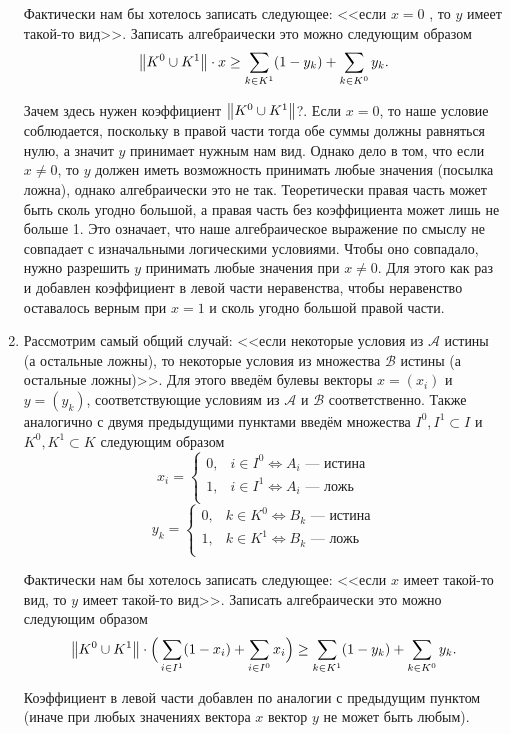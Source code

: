 \begin{enumerate}[nosep]
	Фактически нам бы хотелось записать следующее: <<если $x = 0$ , то $y$ имеет такой-то вид>>. Записать алгебраически это можно следующим образом
	\[
	\norm{K^0 \cup K^1} \cdot x  \ge \sum_{k \in K^1}(1-y_k) + \sum_{k \in K^0}y_k.
	\]
	
	Зачем здесь нужен коэффициент $\norm{K^0 \cup K^1}$?. Если $x = 0$, то наше условие соблюдается, поскольку в правой части тогда обе суммы должны равняться нулю, а значит $y$ принимает нужным нам вид. Однако дело в том, что если $x \neq 0$, то $y$ должен иметь возможность принимать любые значения (посылка ложна), однако алгебраически это не так. Теоретически правая часть может быть сколь угодно большой, а правая часть без коэффициента может лишь не больше 1. Это означает, что наше алгебраическое выражение по смыслу не совпадает с изначальными логическими условиями. Чтобы оно совпадало, нужно разрешить $y$ принимать любые значения при $x \neq 0$. Для этого как раз и добавлен коэффициент в левой части неравенства, чтобы неравенство оставалось верным при $x = 1$ и сколь угодно большой правой части.
	
	\item Рассмотрим самый общий случай: <<если некоторые условия из $\mathcal{A}$ истины (а остальные ложны), то некоторые условия из множества $\mathcal{B}$ истины (а остальные ложны)>>. Для этого введём булевы векторы $x = (x_i)$ и $y = (y_k)$, соответствующие условиям из $\mathcal{A}$ и $\mathcal{B}$ соответственно. Также аналогично с двумя предыдущими пунктами введём множества $I^0, I^1 \subset I$ и $K^0, K^1 \subset K$ следующим образом
	\[
	x_i = \begin{cases}
		0,& i \in I^0 \Leftrightarrow \text{$A_i$ --- истина}\\
		1,& i \in I^1 \Leftrightarrow \text{$A_i$ --- ложь}\\
	\end{cases}
	\]
	\[
	y_k = \begin{cases}
		0,& k \in K^0 \Leftrightarrow \text{$B_k$ --- истина}\\
		1,& k \in K^1 \Leftrightarrow \text{$B_k$ --- ложь}\\
	\end{cases}
	\]
	
	Фактически нам бы хотелось записать следующее: <<если $x$ имеет такой-то вид, то $y$ имеет такой-то вид>>. Записать алгебраически это можно следующим образом
	\[
	\norm{K^0 \cup K^1} \cdot \Big(\sum_{i \in I^1}(1-x_i) + \sum_{i \in I^0}x_i\Big) \ge \sum_{k \in K^1}(1-y_k) + \sum_{k \in K^0}y_k.
	\]
	
	Коэффициент в левой части добавлен по аналогии с предыдущим пунктом (иначе при любых значениях вектора $x$ вектор $y$ не может быть любым).
\end{enumerate}

